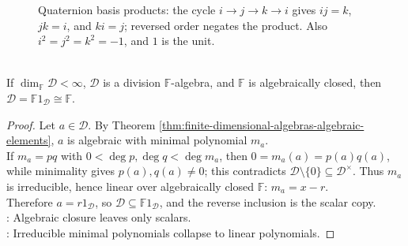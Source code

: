 \begin{figure}[H]
  \centering
  
  \caption{Quaternion basis products: the cycle $i\to j\to k\to i$ gives
  $ij=k$, $jk=i$, and $ki=j$; reversed order negates the product. Also
  $i^2=j^2=k^2=-1$, and $1$ is the unit.}
  \label{fig:quaternion-multiplication-cycle}
\end{figure}

\begin{theorem} \label{thm:division-algebra-algebraically-closed-field} \\
If $\dim_{\mathbb{F}}\mathcal{D}<\infty$, $\mathcal{D}$ is a division $\mathbb{F}$-algebra, and $\mathbb{F}$ is algebraically closed, then $\mathcal{D}=\mathbb{F}1_{\mathcal{D}}\cong\mathbb{F}$.
\begin{proof}
Let $a\in\mathcal{D}$. By Theorem \ref{thm:finite-dimensional-algebras-algebraic-elements}, $a$ is algebraic with minimal polynomial $m_a$.\\
If $m_a=pq$ with $0<\deg p,\deg q<\deg m_a$, then $0=m_a(a)=p(a)q(a)$, while minimality gives $p(a),q(a)\neq0$; this contradicts $\mathcal{D}\setminus\{0\}\subseteq\mathcal{D}^{\times}$. Thus $m_a$ is irreducible, hence linear over algebraically closed $\mathbb{F}$: $m_a=x-r$.\\
Therefore $a=r1_{\mathcal{D}}$, so $\mathcal{D}\subseteq\mathbb{F}1_{\mathcal{D}}$, and the reverse inclusion is the scalar copy.\\
: Algebraic closure leaves only scalars.\\
: Irreducible minimal polynomials collapse to linear polynomials.
\end{proof}
\end{theorem}

